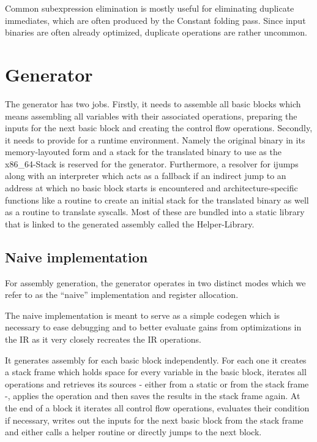 \documentclass[course=eragp]{aspdoc}
\begin{document}
Common subexpression elimination is mostly useful for eliminating duplicate immediates, which are often produced by
the Constant folding pass. Since input binaries are often already optimized, duplicate operations are rather uncommon.


\section{Generator}\label{generator}
The generator has two jobs. %
Firstly, it needs to assemble all basic blocks which means assembling all variables with their associated operations,
preparing the inputs for the next basic block and creating the control flow operations.
Secondly, it needs to provide for a runtime environment. Namely the original binary in its memory-layouted
form and a stack for the translated binary to use as the x86\_64-Stack is reserved for the
generator. Furthermore, a resolver for ijumps
along with an interpreter which acts as a fallback if an indirect jump to an address at which no basic block starts is encountered
and architecture-specific functions like a routine to create an initial stack for the translated binary as well as a routine to translate syscalls.
Most of these are bundled into a static library that is linked to the generated assembly called the
Helper-Library.

\subsection{Naive implementation}

For assembly generation, the generator operates in two distinct modes which we refer to as the
``naive'' implementation and register allocation.

\par

The naive implementation is meant to serve as a simple codegen which is necessary to ease debugging
and to better evaluate gains from
optimizations in the IR as it very closely recreates the IR operations.

\par

It generates assembly for each basic block independently.
For each one it creates a stack frame which holds space for every variable in the basic block, iterates all operations and
retrieves its sources - either from a static or from the stack frame -, applies the operation and then saves the results in the stack frame again.
At the end of a block it iterates all control flow operations, evaluates their condition if necessary, writes out the inputs for the next basic block
from the stack frame and either calls a helper routine or directly jumps to the next block.
\end{document}

